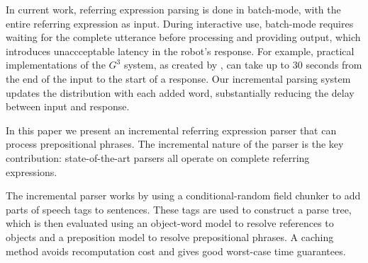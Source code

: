 \documentclass[conference]{IEEEtran}
\numberwithin{equation}{section}
\begin{document}
In current work, referring expression parsing is done in batch-mode, with the entire referring expression as input. \citep{tellex2011understanding,UW_RSE_ICML2012,artzi2013weakly,fang2015embodied} During interactive use, batch-mode requires waiting for the complete utterance before processing and providing output, which introduces unaccceptable latency in the robot's response. For example, practical implementations of the $G^3$ system, as created by \citet{tellex2011understanding}, can take up to 30 seconds from the end of the input to the start of a response. Our incremental parsing system updates the distribution with each added word, substantially reducing the delay between input and response.

In this paper we present an incremental referring expression parser that can process prepositional phrases. The incremental nature of the parser is the key contribution: state-of-the-art parsers all operate on complete referring expressions. 

The incremental parser works by using a conditional-random field chunker to add parts of speech tags to sentences. These tags are used to construct a parse tree, which is then evaluated using an object-word model to resolve references to objects and a preposition model to resolve prepositional phrases. A caching method avoids recomputation cost and gives good worst-case time guarantees.
\end{document}
